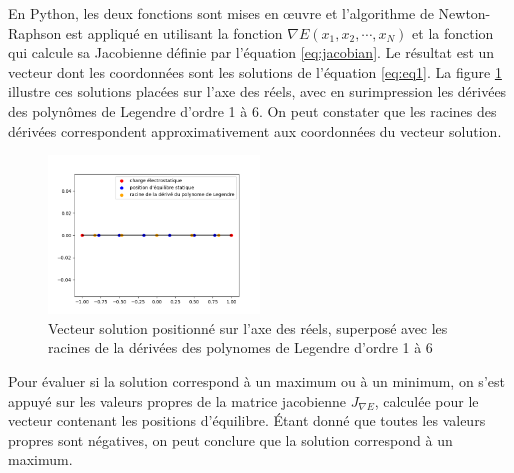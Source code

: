 En Python, les deux fonctions sont mises en œuvre et l'algorithme de Newton-Raphson est appliqué en utilisant la fonction $\nabla E(x_1, x_2, \cdots , x_N)$ et la fonction qui calcule sa Jacobienne définie par l'équation \eqref{eq:jacobian}. Le résultat est un vecteur dont les coordonnées sont les solutions de l'équation \eqref{eq:eq1}. La figure \ref{fig:legendre} illustre ces solutions placées sur l'axe des réels, avec en surimpression les dérivées des polynômes de Legendre d'ordre 1 à 6. On peut constater que les racines des dérivées correspondent approximativement aux coordonnées du vecteur solution.

\begin{figure}[H]
  \centering
  \includegraphics[width=0.5\textwidth]{img/legendre.png}
  \caption{Vecteur solution positionné sur l'axe des réels, superposé avec les racines de la dérivées des polynomes de Legendre d'ordre 1 à 6}
  \label{fig:legendre}
\end{figure}

Pour évaluer si la solution correspond à un maximum ou à un minimum, on s'est appuyé sur les valeurs propres de la matrice jacobienne $J_{\nabla E}$, calculée pour le vecteur contenant les positions d'équilibre. Étant donné que toutes les valeurs propres sont négatives, on peut conclure que la solution correspond à un maximum.


